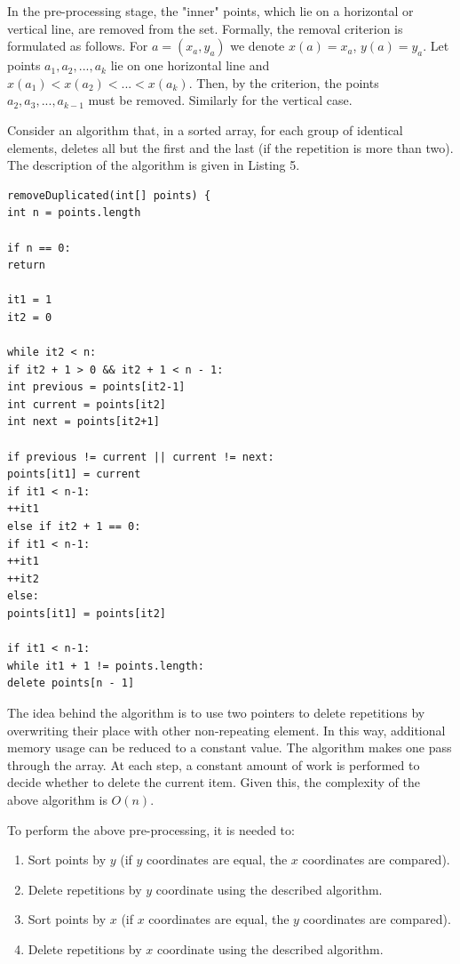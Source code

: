 \documentclass[conference]{IEEEtran}
\theoremstyle{plane}
\begin{document}
In the pre-processing stage, the "inner" points, which lie on a horizontal or vertical line, are removed from the set. Formally, the removal criterion is formulated as follows. For $a = (x_a, y_a)$ we denote $x(a)=x_a$, $y(a)=y_a$. Let points $a_1, a_2, ..., a_k$ lie on one horizontal line and $x(a_1) < x(a_2) <... <x (a_k) $. Then, by the criterion, the points $a_2, a_3, ..., a_{k-1}$ must be removed. Similarly for the vertical case.

Consider an algorithm that, in a sorted array, for each group of identical elements, deletes all but the first and the last (if the repetition is more than two). The description of the algorithm is given in Listing 5.

\begin{lstlisting}[caption={Algorithm of removing duplicates in a sorted array},captionpos=b]
removeDuplicated(int[] points) {
int n = points.length

if n == 0:
return

it1 = 1
it2 = 0

while it2 < n:
if it2 + 1 > 0 && it2 + 1 < n - 1:
int previous = points[it2-1]
int current = points[it2]
int next = points[it2+1]

if previous != current || current != next:
points[it1] = current
if it1 < n-1:
++it1
else if it2 + 1 == 0:
if it1 < n-1:
++it1
++it2
else:
points[it1] = points[it2]

if it1 < n-1:
while it1 + 1 != points.length:
delete points[n - 1]
\end{lstlisting}

The idea behind the algorithm is to use two pointers to delete repetitions by overwriting their place with other non-repeating element. In this way, additional memory usage can be reduced to a constant value. The algorithm makes one pass through the array. At each step, a constant amount of work is performed to decide whether to delete the current item. Given this, the complexity of the above algorithm is $O(n)$.

To perform the above pre-processing, it is needed to:

\begin{enumerate}
	\item
	Sort points by $y$ (if $y$ coordinates are equal, the $x$ coordinates are compared).
	\item
	Delete repetitions by $y$ coordinate using the described algorithm.
	\item
	Sort points by $x$ (if $x$ coordinates are equal, the $y$ coordinates are compared).
	\item
	Delete repetitions by $x$ coordinate using the described algorithm.
\end{enumerate}
\end{document}
